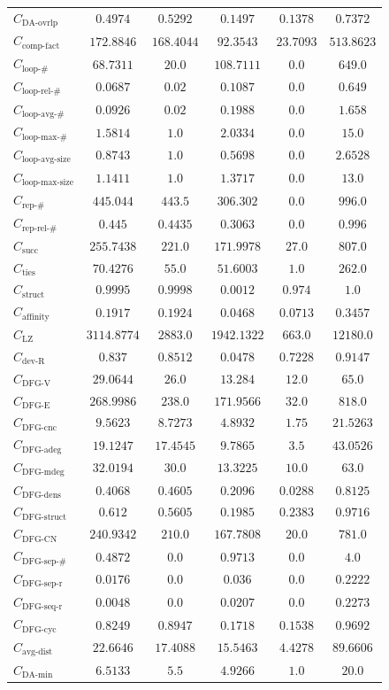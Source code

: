 \documentclass{standalone}
\newcommand{\daminname}{\text{DA-min}}
\newcommand{\damin}{C_{\daminname}}
\newcommand{\daoverlapname}{\text{DA-ovrlp}}
\newcommand{\daoverlap}{C_{\daoverlapname}}
\newcommand{\complexityfactorname}{\text{comp-fact}}
\newcommand{\complexityfactor}{C_{\complexityfactorname}}
\newcommand{\loopnumname}{\text{loop-\#}}
\newcommand{\loopnum}{C_{\loopnumname}}
\newcommand{\looprelnumname}{\text{loop-rel-\#}}
\newcommand{\looprelnum}{C_{\looprelnumname}}
\newcommand{\loopavgname}{\text{loop-avg-\#}}
\newcommand{\loopavg}{C_{\loopavgname}}
\newcommand{\loopmaxname}{\text{loop-max-\#}}
\newcommand{\loopmax}{C_{\loopmaxname}}
\newcommand{\loopavgsizename}{\text{loop-avg-size}}
\newcommand{\loopavgsize}{C_{\loopavgsizename}}
\newcommand{\loopmaxsizename}{\text{loop-max-size}}
\newcommand{\loopmaxsize}{C_{\loopmaxsizename}}
\newcommand{\repnumname}{\text{rep-\#}}
\newcommand{\repnum}{C_{\repnumname}}
\newcommand{\reprelnumname}{\text{rep-rel-\#}}
\newcommand{\reprelnum}{C_{\reprelnumname}}
\newcommand{\dfgnodesname}{\text{DFG-V}}
\newcommand{\dfgnodes}{C_{\dfgnodesname}}
\newcommand{\dfgedgesname}{\text{DFG-E}}
\newcommand{\dfgedges}{C_{\dfgedgesname}}
\newcommand{\dfgcncname}{\text{DFG-cnc}}
\newcommand{\dfgcnc}{C_{\dfgcncname}}
\newcommand{\dfgavgdegname}{\text{DFG-adeg}}
\newcommand{\dfgavgdeg}{C_{\dfgavgdegname}}
\newcommand{\dfgmaxdegname}{\text{DFG-mdeg}}
\newcommand{\dfgmaxdeg}{C_{\dfgmaxdegname}}
\newcommand{\dfgdensname}{\text{DFG-dens}}
\newcommand{\dfgdens}{C_{\dfgdensname}}
\newcommand{\dfgstructname}{\text{DFG-struct}}
\newcommand{\dfgstruct}{C_{\dfgstructname}}
\newcommand{\dfgcycnumbername}{\text{DFG-CN}}
\newcommand{\dfgcycnumber}{C_{\dfgcycnumbername}}
\newcommand{\dfgsepnumname}{\text{DFG-sep-\#}}
\newcommand{\dfgsepnum}{C_{\dfgsepnumname}}
\newcommand{\dfgseprationame}{\text{DFG-sep-r}}
\newcommand{\dfgsepratio}{C_{\dfgseprationame}}
\newcommand{\dfgseqrationame}{\text{DFG-seq-r}}
\newcommand{\dfgseqratio}{C_{\dfgseqrationame}}
\newcommand{\dfgcycname}{\text{DFG-cyc}}
\newcommand{\dfgcyc}{C_{\dfgcycname}}
\newcommand{\numberofneighborhoodsname}{\text{succ}}
\newcommand{\numberofneighborhoods}{C_{\numberofneighborhoodsname}}
\newcommand{\numberoftiesname}{\text{ties}}
\newcommand{\numberofties}{C_{\numberoftiesname}}
\newcommand{\lempelzivname}{\text{LZ}}
\newcommand{\lempelziv}{C_{\lempelzivname}}
\newcommand{\structurename}{\text{struct}}
\newcommand{\structure}{C_{\structurename}}
\newcommand{\affinityname}{\text{affinity}}
\newcommand{\affinity}{C_{\affinityname}}
\newcommand{\deviationfromrandomname}{\text{dev-R}}
\newcommand{\deviationfromrandom}{C_{\deviationfromrandomname}}
\newcommand{\avgdistname}{\text{avg-dist}}
\newcommand{\avgdist}{C_{\avgdistname}}
\begin{document}
\begin{tabular}{lccccc}
$\daoverlap$ & $0.4974$ & $0.5292$ & $0.1497$ & $0.1378$ & $0.7372$ \\ 
$\complexityfactor$ & $172.8846$ & $168.4044$ & $92.3543$ & $23.7093$ & $513.8623$ \\ 
$\loopnum$ & $68.7311$ & $20.0$ & $108.7111$ & $0.0$ & $649.0$ \\ 
$\looprelnum$ & $0.0687$ & $0.02$ & $0.1087$ & $0.0$ & $0.649$ \\ 
$\loopavg$ & $0.0926$ & $0.02$ & $0.1988$ & $0.0$ & $1.658$ \\ 
$\loopmax$ & $1.5814$ & $1.0$ & $2.0334$ & $0.0$ & $15.0$ \\ 
$\loopavgsize$ & $0.8743$ & $1.0$ & $0.5698$ & $0.0$ & $2.6528$ \\ 
$\loopmaxsize$ & $1.1411$ & $1.0$ & $1.3717$ & $0.0$ & $13.0$ \\ 
$\repnum$ & $445.044$ & $443.5$ & $306.302$ & $0.0$ & $996.0$ \\ 
$\reprelnum$ & $0.445$ & $0.4435$ & $0.3063$ & $0.0$ & $0.996$ \\ 
$\numberofneighborhoods$ & $255.7438$ & $221.0$ & $171.9978$ & $27.0$ & $807.0$ \\ 
$\numberofties$ & $70.4276$ & $55.0$ & $51.6003$ & $1.0$ & $262.0$ \\ 
$\structure$ & $0.9995$ & $0.9998$ & $0.0012$ & $0.974$ & $1.0$ \\ 
$\affinity$ & $0.1917$ & $0.1924$ & $0.0468$ & $0.0713$ & $0.3457$ \\ 
$\lempelziv$ & $3114.8774$ & $2883.0$ & $1942.1322$ & $663.0$ & $12180.0$ \\ 
$\deviationfromrandom$ & $0.837$ & $0.8512$ & $0.0478$ & $0.7228$ & $0.9147$ \\ 
$\dfgnodes$ & $29.0644$ & $26.0$ & $13.284$ & $12.0$ & $65.0$ \\ 
$\dfgedges$ & $268.9986$ & $238.0$ & $171.9566$ & $32.0$ & $818.0$ \\ 
$\dfgcnc$ & $9.5623$ & $8.7273$ & $4.8932$ & $1.75$ & $21.5263$ \\ 
$\dfgavgdeg$ & $19.1247$ & $17.4545$ & $9.7865$ & $3.5$ & $43.0526$ \\ 
$\dfgmaxdeg$ & $32.0194$ & $30.0$ & $13.3225$ & $10.0$ & $63.0$ \\ 
$\dfgdens$ & $0.4068$ & $0.4605$ & $0.2096$ & $0.0288$ & $0.8125$ \\ 
$\dfgstruct$ & $0.612$ & $0.5605$ & $0.1985$ & $0.2383$ & $0.9716$ \\ 
$\dfgcycnumber$ & $240.9342$ & $210.0$ & $167.7808$ & $20.0$ & $781.0$ \\ 
$\dfgsepnum$ & $0.4872$ & $0.0$ & $0.9713$ & $0.0$ & $4.0$ \\ 
$\dfgsepratio$ & $0.0176$ & $0.0$ & $0.036$ & $0.0$ & $0.2222$ \\ 
$\dfgseqratio$ & $0.0048$ & $0.0$ & $0.0207$ & $0.0$ & $0.2273$ \\ 
$\dfgcyc$ & $0.8249$ & $0.8947$ & $0.1718$ & $0.1538$ & $0.9692$ \\ 
$\avgdist$ & $22.6646$ & $17.4088$ & $15.5463$ & $4.4278$ & $89.6606$ \\ 
$\damin$ & $6.5133$ & $5.5$ & $4.9266$ & $1.0$ & $20.0$ \\ 
\bottomrule
\end{tabular}
\end{document}
